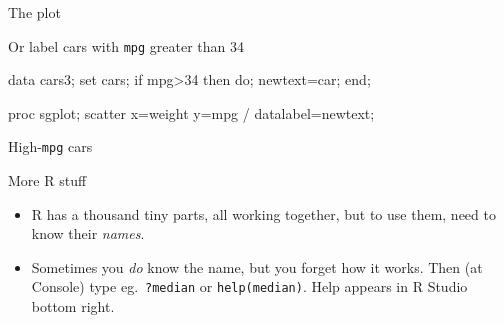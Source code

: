 \documentclass[unknownkeysallowed]{beamer}\usepackage[]{graphicx}\usepackage[]{color}
\begin{document}
\begin{frame}[fragile]{The plot}
  
  
\end{frame}

\begin{frame}[fragile]{Or label cars with \texttt{mpg} greater than
    34}

  \begin{Datastep}
data cars3;
  set cars;
  if mpg>34 then do;
     newtext=car;
  end;
    
  \end{Datastep}
  \begin{Sascode}[store=mjk]
proc sgplot;
  scatter x=weight y=mpg / datalabel=newtext;
  \end{Sascode}

  
\end{frame}

\begin{frame}{High-\texttt{mpg} cars}

  
\end{frame}







\begin{frame}[fragile]{More R stuff}

  \begin{itemize}
  \item R has a thousand tiny parts, all working together, but to use
    them, need to know their \emph{names}.
    
  \item Sometimes you \emph{do} know the name, but you forget how it
    works. Then (at Console) type eg.\ \texttt{?median} or
    \texttt{help(median)}. 
    Help appears in R Studio bottom right.
% 
  \end{itemize}

\end{frame}
\end{document}
